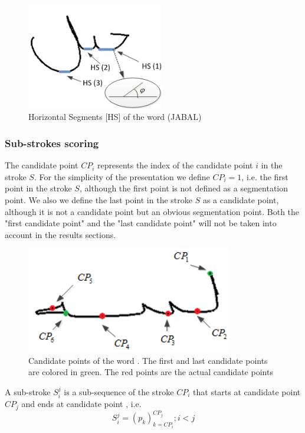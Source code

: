 \documentclass[journal,compsoc]{IEEEtran}
\begin{document}
\begin{figure}
\centering
\includegraphics[width=6cm]{./figures/horizontal_segments}
\caption{Horizontal Segments [HS] of the word (JABAL)}
\label{fig:horizontal_segments}
\end{figure}

\subsubsection{Sub-strokes scoring}
The candidate point $CP_{i}$ represents the index of the candidate point $i$ in the stroke $S$. For the simplicity of the presentation we define $CP_{i}=1$, i.e. the first point in the stroke $S$, although the first point is not defined as a segmentation point. We also we define the last point in the stroke $S$ as a candidate point, although it is not a candidate point but an obvious segmentation point. Both the "first candidate point" and the "last candidate point" will not be taken into account in the results sections.   

\begin{figure}
\centering
\includegraphics[width=9cm]{./figures/candidate_points}
\caption{Candidate points of the word  . The first and last candidate points are colored in green. The red points are the actual candidate points}
\label{fig:candidate_points}
\end{figure}

A sub-stroke $S_{i}^{j}$ is a sub-sequence of the stroke $CP_{i}$ that starts at candidate point $CP_{j}$ and ends at candidate point , i.e.
\begin{equation}
S_{i}^{j}=(p_{k})_{k=CP_{i}}^{CP_{j}}; i<j
\end{equation}
\end{document}
